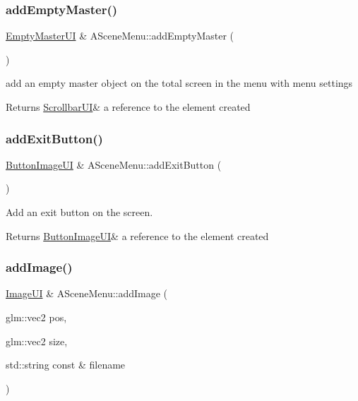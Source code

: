 \subsubsection{\texorpdfstring{add\+Empty\+Master()}{addEmptyMaster()}}
{\footnotesize\ttfamily \hyperlink{class_empty_master_u_i}{Empty\+Master\+UI} \& A\+Scene\+Menu\+::add\+Empty\+Master (\begin{DoxyParamCaption}{ }\end{DoxyParamCaption})}



add an empty master object on the total screen in the menu with menu settings 

\begin{DoxyReturn}{Returns}
\hyperlink{class_scrollbar_u_i}{Scrollbar\+UI}\& a reference to the element created 
\end{DoxyReturn}
\mbox{\label{class_a_scene_menu_ac1883fd509d5ac2306e009bd2cead752}} 
\subsubsection{\texorpdfstring{add\+Exit\+Button()}{addExitButton()}}
{\footnotesize\ttfamily \hyperlink{class_button_image_u_i}{Button\+Image\+UI} \& A\+Scene\+Menu\+::add\+Exit\+Button (\begin{DoxyParamCaption}{ }\end{DoxyParamCaption})}



Add an exit button on the screen. 

\begin{DoxyReturn}{Returns}
\hyperlink{class_button_image_u_i}{Button\+Image\+UI}\& a reference to the element created 
\end{DoxyReturn}
\mbox{\label{class_a_scene_menu_a4476a757ca150acf6ae85a3e64e65558}} 
\subsubsection{\texorpdfstring{add\+Image()}{addImage()}}
{\footnotesize\ttfamily \hyperlink{class_image_u_i}{Image\+UI} \& A\+Scene\+Menu\+::add\+Image (\begin{DoxyParamCaption}\item[{glm\+::vec2}]{pos,  }\item[{glm\+::vec2}]{size,  }\item[{std\+::string const \&}]{filename }\end{DoxyParamCaption})}



